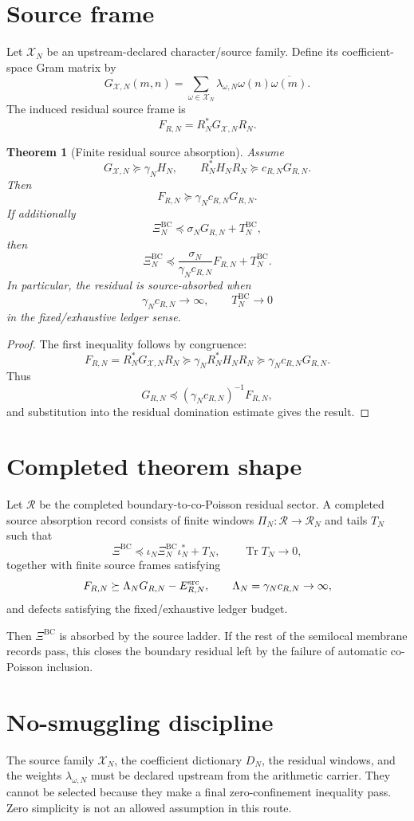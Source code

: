 \documentclass[11pt]{article}
\newtheorem{theorem}{Theorem}
\newcommand{\BC}{\mathrm{BC}}
\newcommand{\Tr}{\operatorname{Tr}}
\begin{document}
\section{Source frame}
Let $\mathcal X_N$ be an upstream-declared character/source family. Define its coefficient-space Gram matrix by
\[
G_{\mathcal X,N}(m,n)
=\sum_{\omega\in\mathcal X_N}\lambda_{\omega,N}\omega(n)\overline{\omega(m)}.
\]
The induced residual source frame is
\[
F_{R,N}=R_N^*G_{\mathcal X,N}R_N.
\]

\begin{theorem}[Finite residual source absorption]
Assume
\[
G_{\mathcal X,N}\succeq \gamma_N H_N,
\qquad
R_N^*H_NR_N\succeq c_{R,N}G_{R,N}.
\]
Then
\[
F_{R,N}\succeq \gamma_Nc_{R,N}G_{R,N}.
\]
If additionally
\[
\Xi^{\BC}_N\preceq \sigma_NG_{R,N}+T_N^{\BC},
\]
then
\[
\Xi^{\BC}_N\preceq \frac{\sigma_N}{\gamma_Nc_{R,N}}F_{R,N}+T_N^{\BC}.
\]
In particular, the residual is source-absorbed when
\[
\gamma_Nc_{R,N}\to\infty,
\qquad
T_N^{\BC}\to0
\]
in the fixed/exhaustive ledger sense.
\end{theorem}

\begin{proof}
The first inequality follows by congruence:
\[
F_{R,N}=R_N^*G_{\mathcal X,N}R_N\succeq \gamma_NR_N^*H_NR_N\succeq \gamma_Nc_{R,N}G_{R,N}.
\]
Thus
\[
G_{R,N}\preceq (\gamma_Nc_{R,N})^{-1}F_{R,N},
\]
and substitution into the residual domination estimate gives the result.
\end{proof}

\section{Completed theorem shape}
Let $\mathcal R$ be the completed boundary-to-co-Poisson residual sector. A completed source absorption record consists of finite windows $\Pi_N:\mathcal R\to\mathcal R_N$ and tails $T_N$ such that
\[
\Xi^{\BC}\preceq \iota_N\Xi^{\BC}_N\iota_N^*+T_N,
\qquad
\Tr T_N\to0,
\]
together with finite source frames satisfying
\[
F_{R,N}\succeq \Lambda_NG_{R,N}-E_{R,N}^{\rm src},
\qquad
\Lambda_N=\gamma_Nc_{R,N}\to\infty,
\]
and defects satisfying the fixed/exhaustive ledger budget.

Then $\Xi^{\BC}$ is absorbed by the source ladder. If the rest of the semilocal membrane records pass, this closes the boundary residual left by the failure of automatic co-Poisson inclusion.

\section{No-smuggling discipline}
The source family $\mathcal X_N$, the coefficient dictionary $D_N$, the residual windows, and the weights $\lambda_{\omega,N}$ must be declared upstream from the arithmetic carrier. They cannot be selected because they make a final zero-confinement inequality pass. Zero simplicity is not an allowed assumption in this route.
\end{document}
